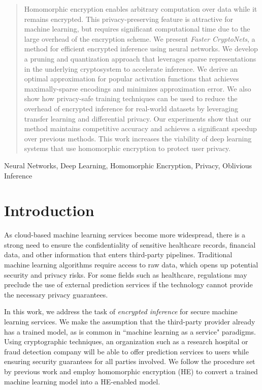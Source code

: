 \documentclass[conference]{IEEEtran}
\begin{document}
\begin{abstract}
Homomorphic encryption enables arbitrary computation over data while it remains encrypted.
This privacy-preserving feature is attractive for machine learning, but requires significant computational time due to the large overhead of the encryption scheme.
We present \textit{Faster CryptoNets}, a method for efficient encrypted inference using neural networks.
We develop a pruning and quantization approach that leverages sparse representations in the underlying cryptosystem to accelerate inference.
We derive an optimal approximation for popular activation functions that achieves maximally-sparse encodings and minimizes approximation error.
We also show how privacy-safe training techniques can be used to reduce the overhead of encrypted inference for real-world datasets by leveraging transfer learning and differential privacy.
Our experiments show that our method maintains competitive accuracy and achieves a significant speedup over previous methods.
This work increases the viability of deep learning systems that use homomorphic encryption to protect user privacy.
\end{abstract}

\begin{IEEEkeywords}
Neural Networks, Deep Learning, Homomorphic Encryption, Privacy, Oblivious Inference
\end{IEEEkeywords}

\section{Introduction}
As cloud-based machine learning services become more widespread, there is a strong need to ensure the confidentiality of sensitive healthcare records, financial data, and other information that enters third-party pipelines.
Traditional machine learning algorithms require access to raw data, which opens up potential security and privacy risks.
For some fields such as healthcare, regulations may preclude the use of external prediction services if the technology cannot provide the necessary privacy guarantees. 

In this work, we address the task of \textit{encrypted inference} for secure machine learning services.
We make the assumption that the third-party provider already has a trained model, as is common in ``machine learning as a service" paradigms.
Using cryptographic techniques, an organization such as a research hospital or fraud detection company will be able to offer prediction services to users while ensuring security guarantees for all parties involved.
We follow the procedure set by previous work \cite{gilad2016cryptonets, xie2014crypto} and employ homomorphic encryption (HE) to convert a trained machine learning model into a HE-enabled model.
\end{document}
